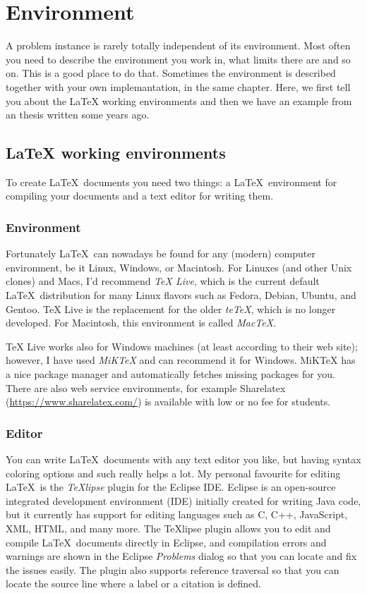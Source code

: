 \chapter{Environment}
\label{chapter:environment}

A problem instance is rarely totally independent of its environment.
Most often you need to describe the environment you work in, what
limits there are and so on. This is a good place to do that. Sometimes
the environment is described together with your own implemantation, in
the same chapter. Here, we first tell you about the LaTeX working
environments and then we have an example from an thesis written some years
ago.


\section{LaTeX working environments}
\label{section:environments}

To create \LaTeX\ documents you need two things: a \LaTeX\ environment for
compiling your documents and a text editor for writing them.

\subsection{Environment}

Fortunately \LaTeX\ can nowadays be found for any (modern) computer
environment, be it Linux, Windows, or Macintosh.
For Linuxes (and other Unix clones) and Macs, I'd recommend \emph{TeX
Live}, which is the current default \LaTeX\ distribution for
many Linux flavors such as Fedora, Debian, Ubuntu, and Gentoo.
TeX Live is the replacement for the older \emph{teTeX}, which is
no longer developed. For Macintosh, this environment is called \emph{MacTeX}.

TeX Live works also for Windows machines (at least according to their web
site); however, I have used \emph{MiKTeX} and can recommend it
for Windows. 
MiKTeX has a nice package manager and automatically fetches missing packages
for you. There are also web service environments, for example
Sharelatex (\url{https://www.sharelatex.com/}) is available with low
or no fee for students.

\subsection{Editor}

You can write \LaTeX\ documents with any text editor you like, but having
syntax coloring options and such really helps a lot.
My personal favourite for editing \LaTeX\ is the
\emph{TeXlipse} plugin for the Eclipse IDE. 
Eclipse is an open-source integrated development environment (IDE) initially
created for writing Java code, but it currently has support for editing
languages such as C, C++, JavaScript, XML, HTML, and many more. 
The TeXlipse plugin allows you to edit and compile \LaTeX\ documents directly
in Eclipse, and compilation errors and warnings are shown in the Eclipse
\emph{Problems} dialog so that you can locate and fix the issues easily.
The plugin also supports reference traversal so that you can locate the source
line where a label or a citation is defined.

